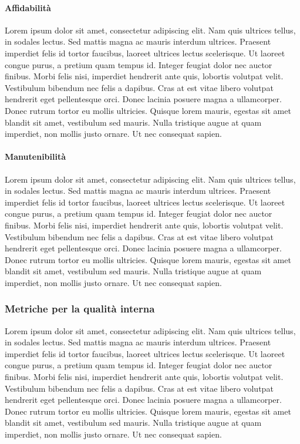 \paragraph{Affidabilità} 
Lorem ipsum dolor sit amet, consectetur adipiscing elit. Nam quis ultrices tellus, in sodales lectus. Sed mattis magna ac mauris interdum ultrices. Praesent imperdiet felis id tortor faucibus, laoreet ultrices lectus scelerisque. Ut laoreet congue purus, a pretium quam tempus id. Integer feugiat dolor nec auctor finibus. Morbi felis nisi, imperdiet hendrerit ante quis, lobortis volutpat velit. Vestibulum bibendum nec felis a dapibus. Cras at est vitae libero volutpat hendrerit eget pellentesque orci. Donec lacinia posuere magna a ullamcorper. Donec rutrum tortor eu mollis ultricies. Quisque lorem mauris, egestas sit amet blandit sit amet, vestibulum sed mauris. Nulla tristique augue at quam imperdiet, non mollis justo ornare. Ut nec consequat sapien.

\paragraph{Manutenibilità} 
Lorem ipsum dolor sit amet, consectetur adipiscing elit. Nam quis ultrices tellus, in sodales lectus. Sed mattis magna ac mauris interdum ultrices. Praesent imperdiet felis id tortor faucibus, laoreet ultrices lectus scelerisque. Ut laoreet congue purus, a pretium quam tempus id. Integer feugiat dolor nec auctor finibus. Morbi felis nisi, imperdiet hendrerit ante quis, lobortis volutpat velit. Vestibulum bibendum nec felis a dapibus. Cras at est vitae libero volutpat hendrerit eget pellentesque orci. Donec lacinia posuere magna a ullamcorper. Donec rutrum tortor eu mollis ultricies. Quisque lorem mauris, egestas sit amet blandit sit amet, vestibulum sed mauris. Nulla tristique augue at quam imperdiet, non mollis justo ornare. Ut nec consequat sapien.

\subsubsection{Metriche per la qualità interna}
Lorem ipsum dolor sit amet, consectetur adipiscing elit. Nam quis ultrices tellus, in sodales lectus. Sed mattis magna ac mauris interdum ultrices. Praesent imperdiet felis id tortor faucibus, laoreet ultrices lectus scelerisque. Ut laoreet congue purus, a pretium quam tempus id. Integer feugiat dolor nec auctor finibus. Morbi felis nisi, imperdiet hendrerit ante quis, lobortis volutpat velit. Vestibulum bibendum nec felis a dapibus. Cras at est vitae libero volutpat hendrerit eget pellentesque orci. Donec lacinia posuere magna a ullamcorper. Donec rutrum tortor eu mollis ultricies. Quisque lorem mauris, egestas sit amet blandit sit amet, vestibulum sed mauris. Nulla tristique augue at quam imperdiet, non mollis justo ornare. Ut nec consequat sapien.

